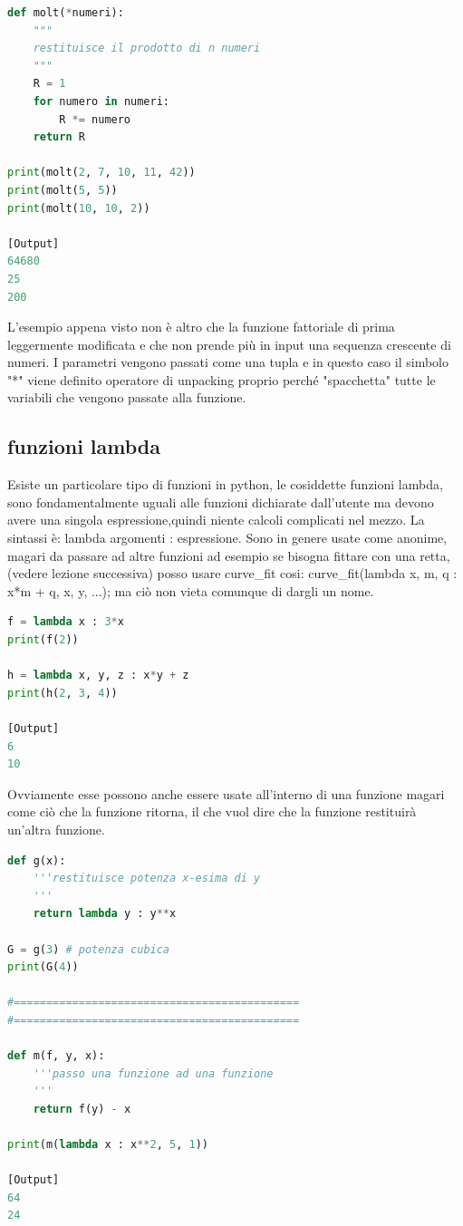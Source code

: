\documentclass[10pt,a4paper]{article}
\begin{document}
\begin{lstlisting}[language=Python]
def molt(*numeri):
    """
    restituisce il prodotto di n numeri
    """
    R = 1
    for numero in numeri:
        R *= numero
    return R

print(molt(2, 7, 10, 11, 42))
print(molt(5, 5))
print(molt(10, 10, 2))

[Output]
64680
25
200

\end{lstlisting}
L'esempio appena visto non è altro che la funzione fattoriale di prima leggermente modificata e che non prende più in input una sequenza crescente di numeri. I parametri vengono passati come una tupla e in questo caso il simbolo "*" viene definito operatore di unpacking proprio perché "spacchetta" tutte le variabili che vengono passate alla funzione.

\subsection{funzioni lambda}
Esiste un particolare tipo di funzioni in python, le cosiddette funzioni lambda, sono fondamentalmente uguali alle funzioni dichiarate dall'utente ma devono avere una singola espressione,quindi niente calcoli complicati nel mezzo. La sintassi è: lambda argomenti : espressione. Sono in genere usate come anonime, magari da passare ad altre funzioni ad esempio se bisogna fittare con una retta, (vedere lezione successiva) posso usare curve\_fit cosi: curve\_fit(lambda x, m, q : x*m + q, x, y, ...); ma ciò non vieta comunque di dargli un nome.
\begin{lstlisting}[language=Python]
f = lambda x : 3*x
print(f(2))

h = lambda x, y, z : x*y + z
print(h(2, 3, 4))

[Output]
6
10
\end{lstlisting}
Ovviamente esse possono anche essere usate all'interno di una funzione magari come ciò che la funzione ritorna, il che vuol dire che la funzione restituirà un'altra funzione.
\begin{lstlisting}[language=Python]
def g(x):
    '''restituisce potenza x-esima di y
    '''
    return lambda y : y**x

G = g(3) # potenza cubica
print(G(4))

#============================================
#============================================

def m(f, y, x):
    '''passo una funzione ad una funzione
    '''
    return f(y) - x

print(m(lambda x : x**2, 5, 1))

[Output]
64
24
\end{lstlisting}
\end{document}

